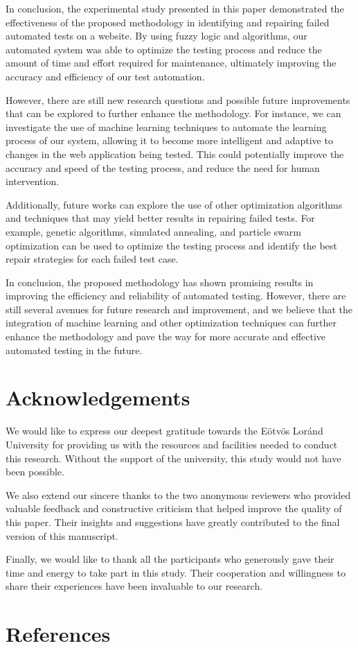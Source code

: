 \documentclass{article}
\begin{document}
In conclusion, the experimental study presented in this paper demonstrated the effectiveness of the proposed methodology in identifying and repairing failed automated tests on a website. By using fuzzy logic and algorithms, our automated system was able to optimize the testing process and reduce the amount of time and effort required for maintenance, ultimately improving the accuracy and efficiency of our test automation.

However, there are still new research questions and possible future improvements that can be explored to further enhance the methodology. For instance, we can investigate the use of machine learning techniques to automate the learning process of our system, allowing it to become more intelligent and adaptive to changes in the web application being tested. This could potentially improve the accuracy and speed of the testing process, and reduce the need for human intervention.

Additionally, future works can explore the use of other optimization algorithms and techniques that may yield better results in repairing failed tests. For example, genetic algorithms, simulated annealing, and particle swarm optimization can be used to optimize the testing process and identify the best repair strategies for each failed test case.

In conclusion, the proposed methodology has shown promising results in improving the efficiency and reliability of automated testing. However, there are still several avenues for future research and improvement, and we believe that the integration of machine learning and other optimization techniques can further enhance the methodology and pave the way for more accurate and effective automated testing in the future.

\maketitle

\section{Acknowledgements}

We would like to express our deepest gratitude towards the Eötvös Loránd University for providing us with the resources and facilities needed to conduct this research. Without the support of the university, this study would not have been possible.

We also extend our sincere thanks to the two anonymous reviewers who provided valuable feedback and constructive criticism that helped improve the quality of this paper. Their insights and suggestions have greatly contributed to the final version of this manuscript.

Finally, we would like to thank all the participants who generously gave their time and energy to take part in this study. Their cooperation and willingness to share their experiences have been invaluable to our research.

\maketitle

\section{References}

\printbibliography[title=References]
\end{document}
